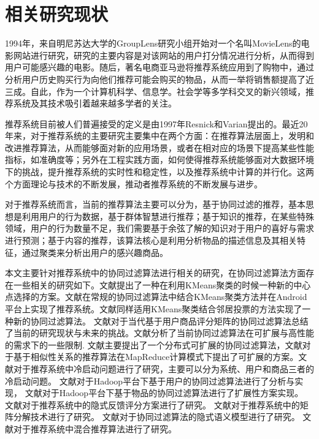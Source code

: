 \section{相关研究现状}
1994年，来自明尼苏达大学的GroupLens研究小组开始对一个名叫MovieLens的电影网站进行研究，研究的主要内容是对该网站的用户打分情况进行分析，从而得到用户可能感兴趣的电影。随后，著名电商亚马逊将推荐系统应用到了购物中，通过分析用户历史购买行为向他们推荐可能会购买的物品，从而一举将销售额提高了近三成。自此，作为一个计算机科学、信息学。社会学等多学科交叉的新兴领域，推荐系统及其技术吸引着越来越多学者的关注。

推荐系统目前被人们普遍接受的定义是由1997年Resnick和Varian提出的\cite{resnick1997recommender}。最近20年来，对于推荐系统的主要研究主要集中在两个方面：在推荐算法层面上，发明和改进推荐算法，从而能够面对新的应用场景，或者在相对应的场景下提高某些性能指标，如准确度等；另外在工程实践方面，如何使得推荐系统能够面对大数据环境下的挑战，提升推荐系统的实时性和稳定性，以及推荐系统中计算的并行化。这两个方面理论与技术的不断发展，推动者推荐系统的不断发展与进步。

对于推荐系统而言，当前的推荐算法主要可以分为，基于协同过滤的推荐，基本思想是利用用户的行为数据，基于群体智慧进行推荐；基于知识的推荐，在某些特殊领域，用户的行为数量不足，我们需要基于余弦了解的知识对于用户的喜好与需求进行预测；基于内容的推荐，该算法核心是利用分析物品的描述信息及其相关特征，通过聚类来分析出用户的感兴趣商品。

本文主要针对推荐系统中的协同过滤算法进行相关的研究，在协同过滤算法方面存在一些相关的研究如下。文献\cite{Zahra:2015ja}提出了一种在利用KMeans聚类的时候一种新的中心点选择的方案。文献\cite{Kularbphettong:2014vm}在常规的协同过滤算法中结合KMeans聚类方法并在Android平台上实现了推荐系统。文献\cite{Dakhel:2011dt}同样适用KMeans聚类结合邻居投票的方法实现了一种新的协同过滤算法。%
文献\cite{Shi:2014fj}\cite{Su:2009cl}对于当代基于用户商品评分矩阵的协同过滤算法总结了当前的研究现状与未来的挑战。文献\cite{Cacheda:2011bh}分析了当前协同过滤算法在可扩展与高性能的需求下的一些限制.
文献\cite{Narang:2011iq}主要提出了一个分布式可扩展的协同过滤算法，文献\cite{Schelter:2012jg}对于基于相似性关系的推荐算法在MapReduce计算模式下提出了可扩展的方案。文献\cite{Liu:2014hc}对于推荐系统中冷启动问题进行了研究，主要可以分为系统、用户和商品三者的冷启动问题。
文献\cite{Zhao:2010ha}对于Hadoop平台下基于用户的协同过滤算法进行了分析与实现，
文献\cite{Jiang:2011bp}对于Hadoop平台下基于物品的协同过滤算法进行了扩展性方案实现。
文献\cite{Hu:2008el}对于推荐系统中的隐式反馈评分方案进行了研究。
文献\cite{Koren:2009jg}对于推荐系统中的矩阵分解技术进行了研究。
文献\cite{hofmann2004latent}对于协同过滤算法的隐式语义模型进行了研究。
文献\cite{Burke:2002fy}对于推荐系统中混合推荐算法进行了研究。

